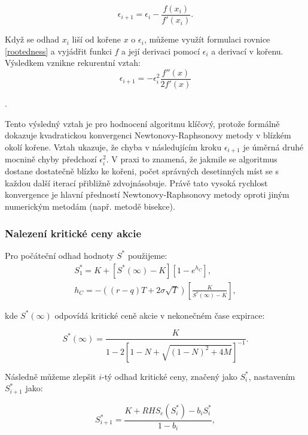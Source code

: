 \documentclass[male,czech,api_bc]{kitheses}
\begin{document}
  \begin{equation}
    \epsilon_{i+1} = \epsilon_i - \frac{f(x_i)}{f'(x_i)}.
  \end{equation}

  Když se odhad $x_i$ liší od kořene $x$ o $\epsilon_i$, můžeme využít formulaci rovnice \eqref{rootedness} a vyjádřit funkci $f$ a její derivaci pomocí $\epsilon_i$ a derivací v kořenu. Výsledkem vznikne rekurentní vztah:
  \begin{equation}
    \epsilon_{i+1} = - \epsilon^2_i \frac{f''(x)}{2 f'(x)}
  \end{equation}

  \parencites[kapitola~9.4]{Press2007}.

  Tento výsledný vztah je pro hodnocení algoritmu klíčový, protože formálně dokazuje kvadratickou konvergenci Newtonovy-Raphsonovy metody v blízkém okolí kořene. Vztah ukazuje, že chyba v následujícím kroku $\epsilon_{i+1}$ je úměrná druhé mocnině chyby předchozí $\epsilon_i^2$. V praxi to znamená, že jakmile se algoritmus dostane dostatečně blízko ke kořeni, počet správných desetinných míst se s každou další iterací přibližně zdvojnásobuje. Právě tato vysoká rychlost konvergence je hlavní předností Newtonovy-Raphsonovy metody oproti jiným numerickým metodám (např. metodě bisekce).

  \subsubsection{Nalezení kritické ceny akcie}

  Pro počáteční odhad hodnoty $S^*$ použijeme:
  \begin{gather}
    S^*_1 = K + [S^*(\infty) - K][1 - e^{h_C}], \\
    h_C = -((r-q)T + 2 \sigma \sqrt{T}) \left[ \frac{K}{S^*(\infty) - K} \right],
  \end{gather}

  kde $S^*(\infty)$ odpovídá kritické ceně akcie v nekonečném čase expirace:

  \begin{equation}
    S^*(\infty) = \frac{K}{1 - 2[1 - N + \sqrt{(1 - N)^2 + 4M}]^{-1}}.
  \end{equation}

  Následně můžeme zlepšit $i$-tý odhad kritické ceny, značený jako $S^*_i$, nastavením $S^*_{i+1}$ jako:

  \begin{equation}
    S^*_{i+1} = \frac{K + RHS_c(S^*_i) - b_i S^*_i}{1 - b_i},
  \end{equation}
\end{document}
